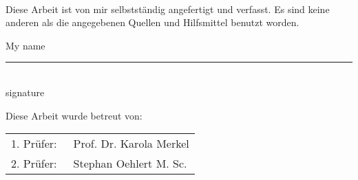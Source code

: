 \clearpage

\mbox{}
\vspace{1.5cm}\\
\noindent Diese Arbeit ist von mir selbstständig angefertigt und verfasst. Es sind keine anderen als die angegebenen Quellen und Hilfsmittel benutzt worden.

\vspace{1cm}
My name \tab[1.5cm] \rule{40mm}{0.2mm}\\
\tab[5cm] signature

\vspace{3cm}
Diese Arbeit wurde betreut von:

	\begin{minipage}[t]{13cm}
		\centering 
		\begin{tabular}{p{4cm}l}
			
			1. Pr\"{u}fer: & ~Prof. Dr. Karola Merkel\\
			2. Pr\"{u}fer: & ~Stephan Oehlert M. Sc.\\
	
			
		\end{tabular}
	\end{minipage}

	\vspace{1.5cm}
